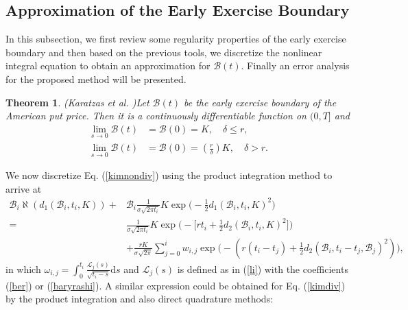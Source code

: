\documentclass[fleqn,final,3p,11pt]{elsarticle}
\newtheorem{theorem}{Theorem}[section]
\theoremstyle{definition}
\theoremstyle{remark}
\numberwithin{equation}{section}
\begin{document}
\subsection{Approximation of the Early Exercise Boundary}
In this subsection, we first review some regularity properties of the early exercise boundary and then based on the previous tools, we discretize the nonlinear integral equation to obtain an approximation for $ \mathcal{B}(t) $. Finally an error analysis for the proposed method will be presented.
\begin{theorem}(Karatzas \textit{et al. }\cite{karatzas1998methods})\label{reg}
	Let $ \mathcal{B}(t) $ be the early exercise boundary of the American put price. Then it is a continuously differentiable function on $ (0,T] $ and
	\begin{equation}\label{w}
	\begin{split}
	\lim_{s\rightarrow 0} \mathcal{B}(t)& = \mathcal{B}(0) = K, \quad \delta \leq r,\\
	\lim_{s\rightarrow 0} \mathcal{B}(t)& = \mathcal{B}(0) =(\frac{r}{\delta}) K, \quad \delta > r.
	\end{split}
	\end{equation}
\end{theorem}
We now discretize Eq. (\ref{kimnondiv}) using the product integration method to arrive at
\begin{equation}\label{diskimnondiv}
\begin{split}
\mathcal{B}_{i}\aleph(d_{1}(\mathcal{B}_{i},t_{i}, K)) +& \mathcal{B}_{i} \frac{1}{\sigma\sqrt{2\pi t_{i}}}K\exp\Big( -\frac{1}{2}d_{1}(\mathcal{B}_{i},t_{i}, K)^{2}\Big) \\
= &\frac{1}{\sigma \sqrt{2\pi t_{i}}}K\exp\Big(-\Big[rt_{i} + \frac{1}{2} d_{2}(\mathcal{B}_{i},t_{i}, K)^{2}\Big]\Big)\\
&+ \frac{rK}{\sigma\sqrt{2\pi}}\sum_{j=0}^{i}w_{i,j} \exp\Big(-(r(t_{i}-t_{j})+\frac{1}{2}d_{2}(\mathcal{B}_{i}, t_{i}-t_{j}, \mathcal{B}_{j})^{2})\Big), \end{split}
\end{equation}
in which $\omega_{i,j} = \int_{0}^{t_{i}} \frac{\mathcal{L}_{j}(s)}{\sqrt{t_{i}-s}}\mathrm{d}s$ and $\mathcal{L}_{j}(s)$ is defined as in (\ref{li}) with the coefficients (\ref{ber}) or (\ref{baryrashi}). A similar expression could be obtained for Eq. (\ref{kimdiv}) by the product integration and also direct quadrature methods:
\end{document}
